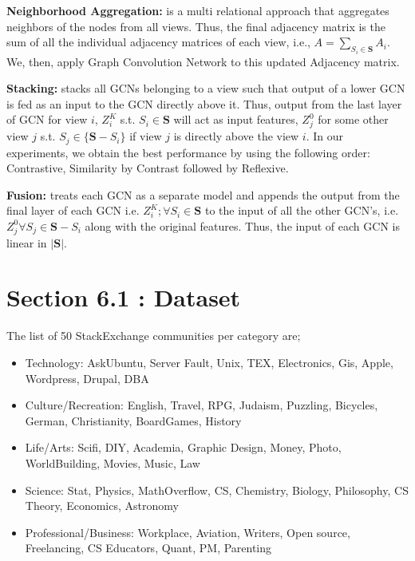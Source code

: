 \documentclass[smallcondensed]{svjour3}     %
\begin{document}
\textbf{Neighborhood Aggregation:} is a multi relational approach that aggregates neighbors of the nodes from all views. Thus, the final adjacency matrix is the sum of all the individual adjacency matrices of each view, i.e., $A = \sum_{S_i \in \mathbf{S}} A_i$. We, then, apply Graph Convolution Network to this updated Adjacency matrix.

\textbf{Stacking:} stacks all GCNs belonging to a view such that output of a lower GCN is fed as an input to the GCN directly above it. Thus, output from the last layer of GCN for view $i$, $Z_i^K$ s.t. $  S_i \in \textbf{S}$ will act as input features, $Z_j^0$ for some other view $j$ s.t. $S_j \in \{\textbf{S}-S_i \}$ if view $j$ is directly above the view $i$. In our experiments, we obtain the best performance by using the following order: Contrastive, Similarity by Contrast followed by Reflexive.

\textbf{Fusion:} treats each GCN as a separate model and appends the output from the final layer of each GCN i.e. $Z_i^K; \forall S_i \in \textbf{S}$ to the input of all the other GCN's, i.e. $Z_j^0 \forall S_j \in \textbf{S}-S_i$ along with the original features. Thus, the input of each GCN is linear in $\vert \textbf{S} \vert$.

\section{Section 6.1 : Dataset}
The list of 50 StackExchange communities per category are;
\begin{itemize}
\item Technology: AskUbuntu, Server Fault, Unix, TEX, Electronics, Gis, Apple, Wordpress, Drupal, DBA

\item Culture/Recreation: English, Travel, RPG, Judaism, Puzzling, Bicycles, German, Christianity, BoardGames, History

\item Life/Arts: Scifi, DIY, Academia, Graphic Design, Money, Photo, WorldBuilding, Movies, Music, Law

\item Science: Stat, Physics, MathOverflow, CS, Chemistry, Biology, Philosophy, CS Theory, Economics, Astronomy

\item Professional/Business: Workplace, Aviation, Writers, Open source, Freelancing, CS Educators, Quant, PM, Parenting
\end{itemize}
\end{document}
